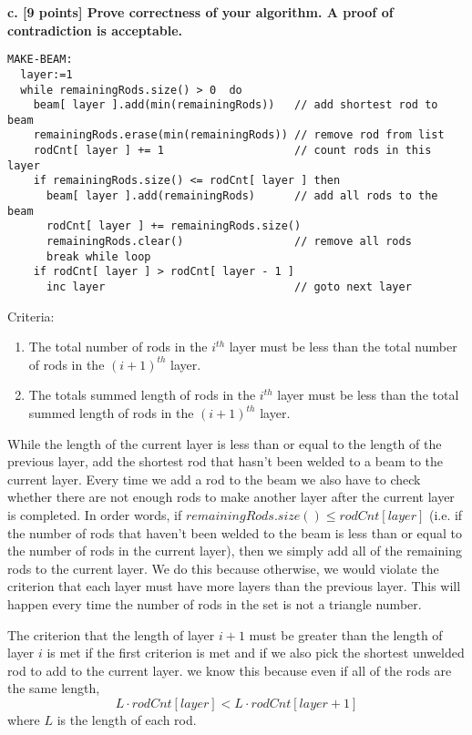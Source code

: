 \documentclass[12pt]{article}
\begin{document}
\newpage
\noindent \textbf{c. [9 points] Prove correctness of your algorithm. A proof of contradiction is acceptable.}

\begin{lstlisting}[frame=single]
MAKE-BEAM:
  layer:=1                                                        
  while remainingRods.size() > 0  do 
    beam[ layer ].add(min(remainingRods))   // add shortest rod to beam
    remainingRods.erase(min(remainingRods)) // remove rod from list
    rodCnt[ layer ] += 1                    // count rods in this layer
    if remainingRods.size() <= rodCnt[ layer ] then
      beam[ layer ].add(remainingRods)      // add all rods to the beam
      rodCnt[ layer ] += remainingRods.size()
      remainingRods.clear()                 // remove all rods 
      break while loop
    if rodCnt[ layer ] > rodCnt[ layer - 1 ]
      inc layer                             // goto next layer
\end{lstlisting} 

Criteria:
\begin{enumerate}
  \item The total number of rods in the $i^{th}$ layer must be less than the
    total number of rods in the $(i+1)^{th}$ layer.
  \item The totals summed length of rods in the $i^{th}$ layer must be less
    than the total summed length of rods in the $(i+1)^{th}$ layer.
\end{enumerate}

While the length of the current layer is less than or equal to the 
length of the previous layer, add the shortest rod that hasn't 
been welded to a beam to the current layer. 
Every time we add a rod to the beam we also have to check whether there 
are not enough rods to make another layer after the current layer is completed. 
In order words, if $ remainingRods.size() \le rodCnt[ layer ] $
(i.e. if the number of rods that haven't been welded to the beam is less than 
or equal to the number of rods in the current layer), 
then we simply add all of the 
remaining rods to the current layer. We do this because otherwise, we would 
violate the criterion that each layer must have more layers than the 
previous layer. 
This will happen every time the number of rods in the set is not a triangle 
number.

The criterion that the length of layer $i+1$ must be greater than the length of 
layer $i$ is met if the first criterion is met and if we also pick the shortest
unwelded rod to add to the current layer. we know this because even if all
of the rods are the same length, 
\[ L \cdot rodCnt[layer] < L \cdot rodCnt[layer+1] \] where $L$ is the length of each rod.
\end{document}
